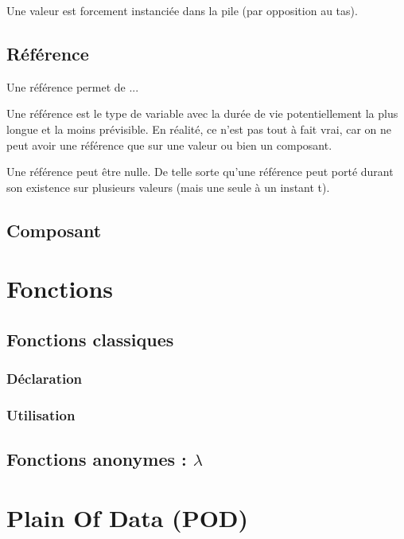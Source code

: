 \documentclass{report}
\begin{document}
Une valeur est forcement instanciée dans la pile (par opposition au tas).

\section{Référence}

Une référence permet de ...

Une référence est le type de variable avec la durée de vie potentiellement la plus longue 
et la moins prévisible. En réalité, ce n'est pas tout à fait vrai, car on ne peut avoir une 
référence que sur une valeur ou bien un composant. 

Une référence peut être nulle. De telle sorte qu'une référence peut porté durant son existence sur
plusieurs valeurs (mais une seule à un instant t).

\section{Composant}





\chapter{Fonctions}

\section{Fonctions classiques}

\subsection{Déclaration}

\subsection{Utilisation}

\section{Fonctions anonymes : $\lambda$}





\chapter{Plain Of Data (POD)}
\end{document}
